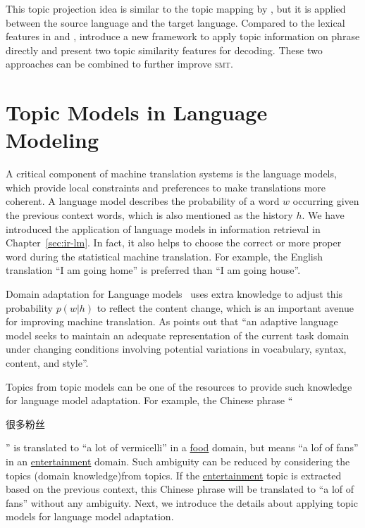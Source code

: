 This topic projection idea is similar to the topic mapping by
\citet{su-12}, but it is applied between the source language and the
target language. Compared to the lexical features in
\citet{Eidelman-12} and \citet{hu-14}, \citet{xiao-12} introduce a new
framework to apply topic information on phrase directly and present
two topic similarity features for decoding. These two approaches can
be combined to further improve \textsc{smt}.



\section{Topic Models in Language Modeling}


A critical component of machine translation systems is the language
models, which provide local constraints and preferences to make
translations more coherent. A language model describes the probability
of a word $w$ occurring given the previous context words, which is
also mentioned as the history $h$. We have introduced the application
of language models in information retrieval in
Chapter~\ref{sec:ir-lm}. In fact, it also helps to choose the correct
or more proper word during the statistical machine translation. For
example, the English translation ``I am going home'' is preferred than
``I am going house''.

Domain adaptation for Language models~\citep{Bellegarda-04,wood-09}
uses extra knowledge to adjust this probability $p(w|h)$ to reflect
the content change, which is an important avenue for improving machine
translation. As \citet{Bellegarda-04} points out that ``an adaptive
language model seeks to maintain an adequate representation of the
current task domain under changing conditions involving potential
variations in vocabulary, syntax, content, and style''.

Topics from topic models can be one of the resources to provide such
knowledge for language model adaptation. For example, the Chinese
phrase ``\begin{CJK*}{UTF8}{gbsn}很多粉丝\end{CJK*}'' is translated to
  ``a lot of vermicelli'' in a \underline{food} domain, but means ``a
  lof of fans'' in an \underline{entertainment} domain. Such ambiguity
  can be reduced by considering the topics (domain knowledge)from
  topics. If the \underline{entertainment} topic is extracted based on
  the previous context, this Chinese phrase will be translated to ``a
  lof of fans'' without any ambiguity. Next, we introduce the details
  about applying topic models for language model adaptation.

